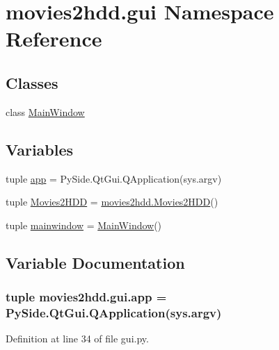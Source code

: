 \hypertarget{namespacemovies2hdd_1_1gui}{\section{movies2hdd.\-gui Namespace Reference}
\label{namespacemovies2hdd_1_1gui}
}
\subsection*{Classes}
\begin{DoxyCompactItemize}
\item 
class \hyperlink{classmovies2hdd_1_1gui_1_1_main_window}{Main\-Window}
\end{DoxyCompactItemize}
\subsection*{Variables}
\begin{DoxyCompactItemize}
\item 
tuple \hyperlink{namespacemovies2hdd_1_1gui_a5113ba41da39d51855bd15d8cf47d7be}{app} = Py\-Side.\-Qt\-Gui.\-Q\-Application(sys.\-argv)
\item 
tuple \hyperlink{namespacemovies2hdd_1_1gui_a47850301e02e470855a027b38dd4b229}{Movies2\-H\-D\-D} = \hyperlink{classmovies2hdd_1_1_movies2_h_d_d}{movies2hdd.\-Movies2\-H\-D\-D}()
\item 
tuple \hyperlink{namespacemovies2hdd_1_1gui_ab66ae08952e6997fa86b05e376de756a}{mainwindow} = \hyperlink{classmovies2hdd_1_1gui_1_1_main_window}{Main\-Window}()
\end{DoxyCompactItemize}


\subsection{Variable Documentation}
\hypertarget{namespacemovies2hdd_1_1gui_a5113ba41da39d51855bd15d8cf47d7be}{
\subsubsection[{app}]{\setlength{\rightskip}{0pt plus 5cm}tuple movies2hdd.\-gui.\-app = Py\-Side.\-Qt\-Gui.\-Q\-Application(sys.\-argv)}}\label{namespacemovies2hdd_1_1gui_a5113ba41da39d51855bd15d8cf47d7be}


Definition at line 34 of file gui.\-py.

